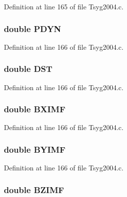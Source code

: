 Definition at line 165 of file Tsyg2004.c.\hypertarget{struct___t_s04_info_6b4050a424d9e166a322d335d97ffa85}{
\subsubsection[{PDYN}]{\setlength{\rightskip}{0pt plus 5cm}double {\bf PDYN}}}
\label{struct___t_s04_info_6b4050a424d9e166a322d335d97ffa85}




Definition at line 166 of file Tsyg2004.c.\hypertarget{struct___t_s04_info_4e71f147ed71b137b574a818a29c5f43}{
\subsubsection[{DST}]{\setlength{\rightskip}{0pt plus 5cm}double {\bf DST}}}
\label{struct___t_s04_info_4e71f147ed71b137b574a818a29c5f43}




Definition at line 166 of file Tsyg2004.c.\hypertarget{struct___t_s04_info_e79afdc213835f23f6c3d9c61149e4e2}{
\subsubsection[{BXIMF}]{\setlength{\rightskip}{0pt plus 5cm}double {\bf BXIMF}}}
\label{struct___t_s04_info_e79afdc213835f23f6c3d9c61149e4e2}




Definition at line 166 of file Tsyg2004.c.\hypertarget{struct___t_s04_info_821525967f196af580b5f98ff816aae8}{
\subsubsection[{BYIMF}]{\setlength{\rightskip}{0pt plus 5cm}double {\bf BYIMF}}}
\label{struct___t_s04_info_821525967f196af580b5f98ff816aae8}




Definition at line 166 of file Tsyg2004.c.\hypertarget{struct___t_s04_info_f36b8e6d8f3578a7f8274ec30917f4a2}{
\subsubsection[{BZIMF}]{\setlength{\rightskip}{0pt plus 5cm}double {\bf BZIMF}}}
\label{struct___t_s04_info_f36b8e6d8f3578a7f8274ec30917f4a2}




